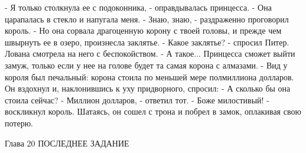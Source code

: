     - Я только столкнула ее с подоконника, - оправдывалась принцесса. 
- Она царапалась в стекло и напугала меня.
    - Знаю, знаю, - раздраженно проговорил король. - Но она сорвала 
драгоценную корону с твоей головы, и прежде чем швырнуть ее в озеро, 
произнесла заклятье.
    - Какое заклятье? - спросил Питер. Лована смотрела на него с 
беспокойством.
    - А такое... Принцесса сможет выйти замуж, только если у нее на 
голове будет та самая корона с алмазами. - Вид у короля был печальный: 
корона стоила по меньшей мере полмиллиона долларов. Он вздохнул и, 
наклонившись к уху придворного, спросил: - А сколько бы она стоила 
сейчас?
    - Миллион долларов, - ответил тот.
    - Боже милостивый! - воскликнул король.
    Шатаясь, он сошел с трона и побрел в замок, оплакивая свою потерю.

        Глава 20
        ПОСЛЕДНЕЕ ЗАДАНИЕ

